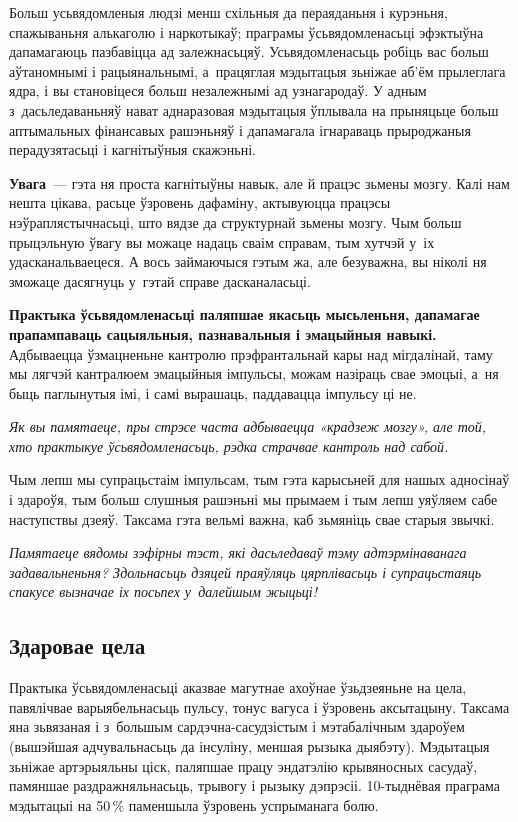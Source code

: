Больш усьвядомленыя людзі менш схільныя да пераяданьня і курэньня, спажываньня алькаголю і наркотыкаў; праграмы ўсьвядомленасьці эфэктыўна дапамагаюць пазбавіцца ад залежнасьцяў. Усьвядомленасьць робіць вас больш аўтаномнымі і рацыянальнымі, а~працяглая мэдытацыя зьніжае аб'ём прылеглага ядра, і вы становіцеся больш незалежнымі ад узнагародаў. У адным з~дасьледаваньняў нават аднаразовая мэдытацыя ўплывала на прыняцьце больш аптымальных фінансавых рашэньняў і дапамагала ігнараваць прыроджаныя перадузятасьці і кагнітыўныя скажэньні.

\textbf{Увага}~--- гэта ня проста кагнітыўны навык, але й працэс зьмены мозгу. Калі нам нешта цікава, расьце ўзровень дафаміну, актывуюцца працэсы нэўраплястычнасьці, што вядзе да структурнай зьмены мозгу. Чым больш прыцэльную ўвагу вы можаце надаць сваім справам, тым хутчэй у~іх удасканальваецеся. А вось займаючыся гэтым жа, але безуважна, вы ніколі ня зможаце дасягнуць у~гэтай справе дасканаласьці.

\textbf{Практыка ўсьвядомленасьці паляпшае якасьць мысьленьня, дапамагае прапампаваць сацыяльныя, пазнавальныя і эмацыйныя навыкі.} Адбываецца ўзмацненьне кантролю прэфрантальнай кары над мігдалінай, таму мы лягчэй кантралюем эмацыйныя імпульсы, можам назіраць свае эмоцыі, а~ня быць паглынутыя імі, і самі вырашаць, паддавацца імпульсу ці не.

\emph{Як вы памятаеце, пры стрэсе часта адбываецца «крадзеж мозгу», але той, хто практыкуе ўсьвядомленасьць, рэдка страчвае кантроль над сабой.}

Чым лепш мы супрацьстаім імпульсам, тым гэта карысьней для нашых адносінаў і здароўя, тым больш слушныя рашэньні мы прымаем і тым лепш уяўляем сабе наступствы дзеяў. Таксама гэта вельмі важна, каб зьмяніць свае старыя звычкі. 

\emph{Памятаеце вядомы зэфірны тэст, які дасьледаваў тэму адтэрмінаванага задавальненьня? Здольнасьць дзяцей праяўляць цярплівасьць і супрацьстаяць спакусе вызначае іх посьпех у~далейшым жыцьці!}

\subsection*{Здаровае цела}

Практыка ўсьвядомленасьці аказвае магутнае ахоўнае ўзьдзеяньне на цела, павялічвае варыябельнасьць пульсу, тонус вагуса і ўзровень аксытацыну. Таксама яна зьвязаная і з~большым сардэчна-сасудзістым і мэтабалічным здароўем (вышэйшая адчувальнасьць да інсуліну, меншая рызыка дыябэту). Мэдытацыя зьніжае артэрыяльны ціск, паляпшае працу эндатэлію крывяносных сасудаў, памяншае раздражняльнасьць, трывогу і рызыку дэпрэсіі. 10-тыднёвая праграма мэдытацыі на 50\,\% паменшыла ўзровень успрыманага болю.


